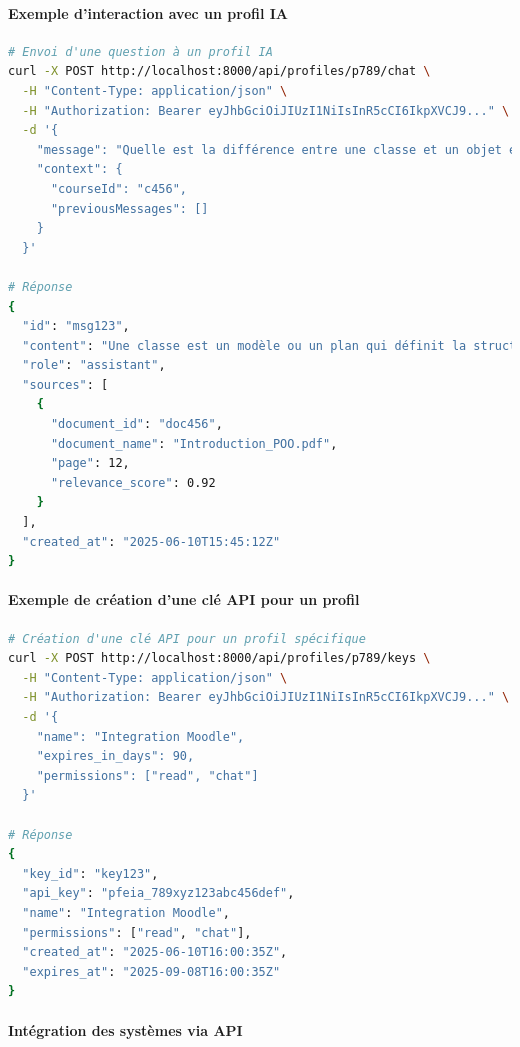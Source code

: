 \paragraph{Exemple d'interaction avec un profil IA}

\begin{lstlisting}[style=codestyle, language=bash]
# Envoi d'une question à un profil IA
curl -X POST http://localhost:8000/api/profiles/p789/chat \
  -H "Content-Type: application/json" \
  -H "Authorization: Bearer eyJhbGciOiJIUzI1NiIsInR5cCI6IkpXVCJ9..." \
  -d '{
    "message": "Quelle est la différence entre une classe et un objet en programmation orientée objet?",
    "context": {
      "courseId": "c456",
      "previousMessages": []
    }
  }'

# Réponse
{
  "id": "msg123",
  "content": "Une classe est un modèle ou un plan qui définit la structure et le comportement (attributs et méthodes) que les objets de ce type auront. Un objet, quant à lui, est une instance concrète d'une classe qui occupe de l'espace mémoire et possède des valeurs spécifiques pour ses attributs. En résumé, une classe est le concept abstrait tandis qu'un objet est la réalisation concrète de ce concept.",
  "role": "assistant",
  "sources": [
    {
      "document_id": "doc456",
      "document_name": "Introduction_POO.pdf",
      "page": 12,
      "relevance_score": 0.92
    }
  ],
  "created_at": "2025-06-10T15:45:12Z"
}
\end{lstlisting}

\paragraph{Exemple de création d'une clé API pour un profil}

\begin{lstlisting}[style=codestyle, language=bash]
# Création d'une clé API pour un profil spécifique
curl -X POST http://localhost:8000/api/profiles/p789/keys \
  -H "Content-Type: application/json" \
  -H "Authorization: Bearer eyJhbGciOiJIUzI1NiIsInR5cCI6IkpXVCJ9..." \
  -d '{
    "name": "Integration Moodle",
    "expires_in_days": 90,
    "permissions": ["read", "chat"]
  }'

# Réponse
{
  "key_id": "key123",
  "api_key": "pfeia_789xyz123abc456def",
  "name": "Integration Moodle",
  "permissions": ["read", "chat"],
  "created_at": "2025-06-10T16:00:35Z",
  "expires_at": "2025-09-08T16:00:35Z"
}
\end{lstlisting}

\paragraph{Intégration des systèmes via API}

